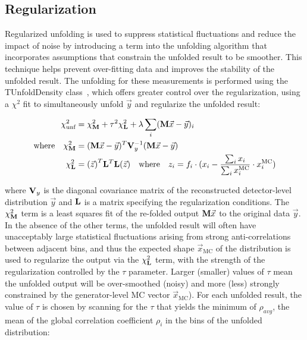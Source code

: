 \begin{refsection}
\subsection{Regularization}
\label{Regularization}
Regularized unfolding is used to suppress statistical fluctuations and reduce the impact of noise by introducing a term into the unfolding algorithm that incorporates assumptions that constrain the unfolded result to be smoother.
This technique helps prevent over-fitting data and improves the stability of the unfolded result.
The unfolding for these measurements is performed using the TUnfoldDensity class~\cite{TUnfold}, which offers greater control over the regularization, using a $\chi^{2}$ fit to simultaneously unfold $\vec{y}$ and regularize the unfolded result:
\begin{linenomath*}
\begin{align}
\chi^{2}_{\text{unf}}&=\chi^{2}_{\mathbf{M}}+\tau^{2}\chi^{2}_{\mathbf{L}}+\lambda\sum_{i}(\mathbf{M}\vec{x}-\vec{y})_{i} \\
\mathrm{where \quad} \chi^{2}_{\mathbf{M}}&=(\mathbf{M}\vec{x}-\vec{y})^{T}\mathbf{V}_{y}^{-1}(\mathbf{M}\vec{x}-\vec{y}) \\
\chi^{2}_{\mathbf{L}}&={(\vec{z})}^{T}\mathbf{L}^{T}\mathbf{L}{(\vec{z})} \quad \text{where} \quad z_i = f_i \cdot (x_i - \frac{\sum_i x_i}{\sum_i x^{\text{MC}}_i} \cdot x^{\text{MC}}_i)
\label{eq:Chi2TUnfold}
\end{align}
\end{linenomath*}
where $\mathbf{V}_{y}$ is the diagonal covariance matrix of the reconstructed detector-level distribution $\vec{y}$ and $\mathbf{L}$ is a matrix specifying the regularization conditions.
The $\chi^{2}_{\mathbf{M}}$ term is a least squares fit of the re-folded output $\mathbf{M}\vec{x}$ to the original data $\vec{y}$.
In the absence of the other terms, the unfolded result will often have unacceptably large statistical fluctuations arising from strong anti-correlations between adjacent bins, and thus the expected shape $\vec{x}_{\text{MC}}$ of the distribution is used to regularize the output via the $\chi^{2}_{\mathbf{L}}$ term, with the strength of the regularization controlled by the $\tau$ parameter. 
Larger (smaller) values of $\tau$ mean the unfolded output will be over-smoothed (noisy) and more (less) strongly constrained by the generator-level MC vector $\vec{x}_{\text{MC}}$).
For each unfolded result, the value of $\tau$ is chosen by scanning for the $\tau$ that yields the minimum of $\rho_{avg}$, the mean of the global correlation coefficient $\rho_{i}$ in the bins of the unfolded distribution:

\end{refsection}
